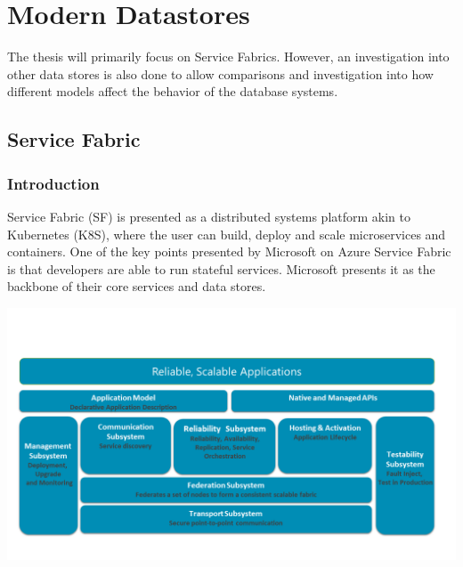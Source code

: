 \documentclass[a4paper,10pt,titlepage]{report}
\begin{document}







    \newpage


    \chapter{Modern Datastores}

    The thesis will primarily focus on Service Fabrics. However, an investigation into other data stores is also done to allow comparisons and investigation into how different models affect the behavior of the database systems.


    \section{Service Fabric}

    \subsection{Introduction}

    Service Fabric (SF) is presented as a distributed systems platform akin to Kubernetes (K8S), where the user can build, deploy and scale microservices and containers. One of the key points presented by Microsoft on Azure Service Fabric is that developers are able to run stateful services. Microsoft presents it as the backbone of their core services and data stores.\\
    \vspace{5mm}

    \includegraphics[scale=0.5]{images/service-fabric-architecture.png}
\end{document}
